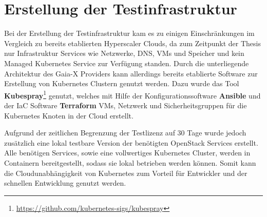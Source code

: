\section{Erstellung der Testinfrastruktur}
\label{sec:gaia-x-einbettung:erstellung-testinfra}
Bei der Erstellung der Testinfrastruktur kam es zu einigen Einschränkungen im Vergleich zu bereits etablierten Hyperscaler Clouds,
da zum Zeitpunkt der Thesis nur Infrastruktur Services wie Netzwerke, DNS, \acp{VM} und Speicher
und kein Managed Kubernetes Service zur Verfügung standen.
Durch die unterliegende Architektur des Gaia-X Providers kann allerdings bereits etablierte Software
zur Erstellung von Kubernetes Clustern genutzt werden.
Dazu wurde das Tool \textbf{Kubespray}\footnote{\url{https://github.com/kubernetes-sigs/kubespray}} genutzt,
welches mit Hilfe der Konfigurationssoftware \textbf{Ansible} und der \ac{IaC} Software \textbf{Terraform}
\acp{VM}, Netzwerk und Sicherheitsgruppen für die Kubernetes Knoten in der Cloud erstellt.

Aufgrund der zeitlichen Begrenzung der Testlizenz auf 30 Tage wurde jedoch zusätzlich eine lokal
testbare Version der benötigten OpenStack Services erstellt.
Alle benötigen Services, sowie eine vollwertiges Kubernetes Cluster, werden in Containern bereitgestellt,
sodass sie lokal betrieben werden können.
Somit kann die Cloudunabhängigkeit von Kubernetes zum Vorteil für Entwickler und der schnellen Entwicklung genutzt werden.